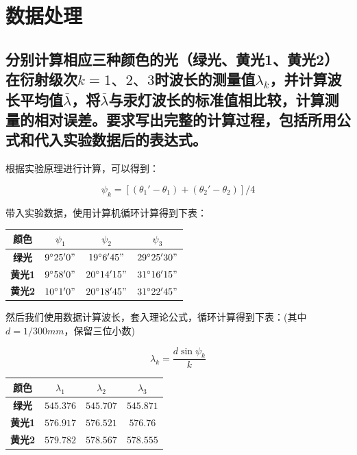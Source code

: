 \documentclass{ctexart}
\begin{document}
\newpage

\section{数据处理}

\subsection{分别计算相应三种颜色的光（绿光、黄光1、黄光2）在衍射级次$k=1、2、3$时波长的测量值$\lambda_k$，并计算波长平均值$\overline{\lambda}$，将$\overline{\lambda}$与汞灯波长的标准值相比较，计算测量的相对误差。要求写出完整的计算过程，包括所用公式和代入实验数据后的表达式。}

根据实验原理进行计算，可以得到：

$$ \psi_k = \left[(\theta_1'-\theta_1)+(\theta_2'-\theta_2)\right]/4 $$

带入实验数据，使用计算机循环计算得到下表：
\begin{table}[!h]
    \centering
    \begin{tabular}{c ccc}
        \toprule
        \textbf{颜色} & $\psi_1$ & $\psi_2$ & $\psi_3$ \\
        \midrule
        \textbf{绿光} & $9^\circ 25' 0"$ & $19^\circ 6' 45"$ & $29^\circ 25' 30"$\\
        \textbf{黄光1} & $9^\circ 58' 0"$ & $20^\circ 14' 15"$ & $31^\circ 16' 15"$\\
        \textbf{黄光2} & $10^\circ 1' 0"$ & $20^\circ 18' 45"$ & $31^\circ 22' 45"$\\
        \bottomrule
    \end{tabular}
\end{table}

然后我们使用数据计算波长，套入理论公式，循环计算得到下表：(其中$d=1/300mm$，保留三位小数)

$$ \lambda_k = \frac{d\sin\psi_k}{k} $$

\begin{table}[!h]
    \centering
    \begin{tabular}{c ccc}
        \toprule
        \textbf{颜色} & $\lambda_1$ & $\lambda_2$ & $\lambda_3$ \\
        \midrule
        \textbf{绿光} & $545.376$ & $545.707$ & $545.871$\\
        \textbf{黄光1} & $576.917$ & $576.521$ & $576.76$\\
        \textbf{黄光2} & $579.782$ & $578.567$ & $578.555$\\
        \bottomrule
    \end{tabular}
\end{table}
\end{document}

